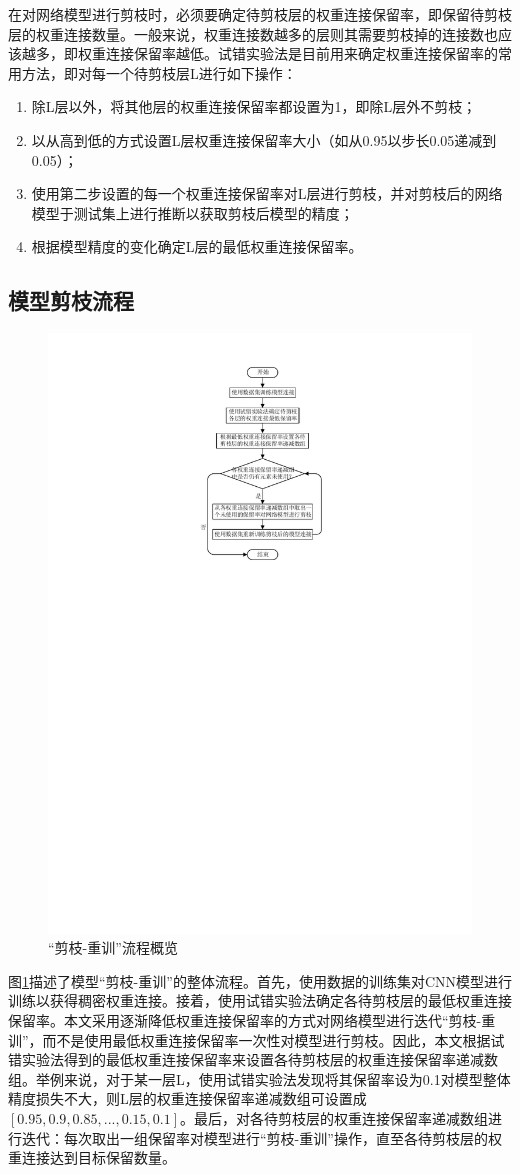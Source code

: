 在对网络模型进行剪枝时，必须要确定待剪枝层的权重连接保留率，即保留待剪枝层的权重连接数量。一般来说，权重连接数越多的层则其需要剪枝掉的连接数也应该越多，即权重连接保留率越低。试错实验法是目前用来确定权重连接保留率的常用方法，即对每一个待剪枝层L进行如下操作：
\begin{enumerate}
  \item 除L层以外，将其他层的权重连接保留率都设置为1，即除L层外不剪枝；
  \item 以从高到低的方式设置L层权重连接保留率大小（如从0.95以步长0.05递减到0.05）；
  \item 使用第二步设置的每一个权重连接保留率对L层进行剪枝，并对剪枝后的网络模型于测试集上进行推断以获取剪枝后模型的精度；
  \item 根据模型精度的变化确定L层的最低权重连接保留率。
\end{enumerate}


\subsection{模型剪枝流程}

\begin{figure}[htbp]
    \centering
    \includegraphics[height=0.8\textwidth]{figures/prune.pdf}
    \caption{“剪枝-重训”流程概览}\label{figure:figure20}
\end{figure}

图\ref{figure:figure20}描述了模型“剪枝-重训”的整体流程。首先，使用数据的训练集对CNN模型进行训练以获得稠密权重连接。接着，使用试错实验法确定各待剪枝层的最低权重连接保留率。本文采用逐渐降低权重连接保留率的方式对网络模型进行迭代“剪枝-重训”，而不是使用最低权重连接保留率一次性对模型进行剪枝。因此，本文根据试错实验法得到的最低权重连接保留率来设置各待剪枝层的权重连接保留率递减数组。举例来说，对于某一层L，使用试错实验法发现将其保留率设为0.1对模型整体精度损失不大，则L层的权重连接保留率递减数组可设置成$[0.95,0.9,0.85,...,0.15,0.1]$。最后，对各待剪枝层的权重连接保留率递减数组进行迭代：每次取出一组保留率对模型进行“剪枝-重训”操作，直至各待剪枝层的权重连接达到目标保留数量。

